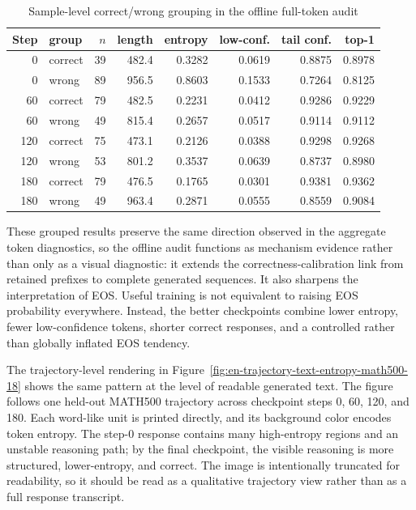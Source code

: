 \begin{table}[H]
    \centering
    \caption{Sample-level correct/wrong grouping in the offline full-token audit}
    \label{tab:en-full-token-correct-wrong-sample-summary}
    \scriptsize
    \setlength{\tabcolsep}{3pt}
    \begin{tabular}{rlrrrrrr}
        \toprule
        Step & group & $n$ & length & entropy & low-conf. & tail conf. & top-1 \\
        \midrule
        0 & correct & 39 & 482.4 & 0.3282 & 0.0619 & 0.8875 & 0.8978 \\
        0 & wrong & 89 & 956.5 & 0.8603 & 0.1533 & 0.7264 & 0.8125 \\
        60 & correct & 79 & 482.5 & 0.2231 & 0.0412 & 0.9286 & 0.9229 \\
        60 & wrong & 49 & 815.4 & 0.2657 & 0.0517 & 0.9114 & 0.9112 \\
        120 & correct & 75 & 473.1 & 0.2126 & 0.0388 & 0.9298 & 0.9268 \\
        120 & wrong & 53 & 801.2 & 0.3537 & 0.0639 & 0.8737 & 0.8980 \\
        180 & correct & 79 & 476.5 & 0.1765 & 0.0301 & 0.9381 & 0.9362 \\
        180 & wrong & 49 & 963.4 & 0.2871 & 0.0555 & 0.8559 & 0.9084 \\
        \bottomrule
    \end{tabular}
\end{table}

These grouped results preserve the same direction observed in the aggregate token diagnostics, so the offline audit functions as mechanism evidence rather than only as a visual diagnostic: it extends the correctness-calibration link from retained prefixes to complete generated sequences. It also sharpens the interpretation of EOS. Useful training is not equivalent to raising EOS probability everywhere. Instead, the better checkpoints combine lower entropy, fewer low-confidence tokens, shorter correct responses, and a controlled rather than globally inflated EOS tendency.

The trajectory-level rendering in Figure~\ref{fig:en-trajectory-text-entropy-math500-18} shows the same pattern at the level of readable generated text. The figure follows one held-out MATH500 trajectory across checkpoint steps 0, 60, 120, and 180. Each word-like unit is printed directly, and its background color encodes token entropy. The step-0 response contains many high-entropy regions and an unstable reasoning path; by the final checkpoint, the visible reasoning is more structured, lower-entropy, and correct. The image is intentionally truncated for readability, so it should be read as a qualitative trajectory view rather than as a full response transcript.

